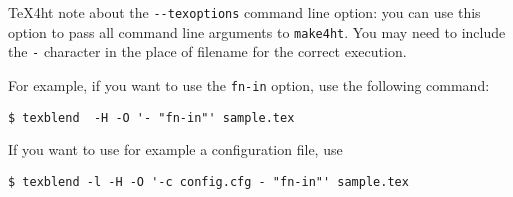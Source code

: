 
\TeX4ht note about the \verb|--texoptions| command line option: you can use
this option to pass all command line arguments to \verb|make4ht|. You may need
to include the \verb|-| character in the place of filename for the correct
execution.

For example, if you want to use the \verb|fn-in| option, use the following command:

\begin{verbatim}
$ texblend  -H -O '- "fn-in"' sample.tex
\end{verbatim}

If you want to use for example a configuration file, use

\begin{verbatim}
$ texblend -l -H -O '-c config.cfg - "fn-in"' sample.tex
\end{verbatim}
